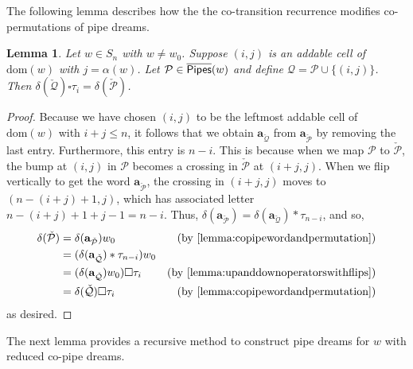 \documentclass[12 pt]{amsart}
\newcommand{\dom}{\mathrm{dom}}
\newcommand{\addable}{\alpha}
\newtheorem{lemma}[Theorem]{Lemma}
\numberwithin{equation}{section}
\theoremstyle{remark}
\newcommand{\kpipes}{\overline{\sf Pipes}}
\newcommand{\demprod}{\delta}
\begin{document}
		The following lemma describes how the the co-transition recurrence modifies co-permutations of pipe dreams.
		
		\begin{lemma}
			\label{lemma:cotransitionflippermutation}
			Let $w \in S_n$ with $w \neq w_0$. 
			Suppose $(i,j)$ is an addable cell of $\dom(w)$ with $j = \addable(w)$. 
			Let $\mathcal{P} \in \kpipes(w)$ and define $\mathcal{Q} = \mathcal{P} \cup \{(i,j)\}$.
			Then $\demprod(\check{\mathcal{Q}})\square \tau_i = \demprod(\check{\mathcal{P}})$.
		\end{lemma}
		
		\begin{proof}
			Because we have chosen $(i,j)$ to be the leftmost addable cell of $\dom(w)$ with $i + j\leq n$, it follows that we obtain ${\mathbf{a}}_{\check{\mathcal{Q}}}$ from ${\mathbf{a}}_{\check{\mathcal{P}}}$ by removing the last entry. 
			Furthermore, this entry is $n - i$. This is because when we map $\mathcal{P}$ to $\check{\mathcal{P}}$, the bump at $(i,j)$ in $\mathcal{P}$ becomes a crossing in $\check{\mathcal{P}}$ at $(i+j,j)$. When we flip vertically to get the word $\mathbf{a}_{\check{\mathcal{P}}}$, the crossing in $(i+j,j)$ moves to $(n-(i+j)+1,j)$, which has associated letter $n-(i+j)+1+j-1=n-i$.
			Thus, $\demprod({\mathbf{a}}_{\check{\mathcal{P}}}) = \demprod({\mathbf{a}}_{\check{\mathcal{Q}}})*\tau_{n-i}$, and so,
			\begin{align*}
				\demprod(\check{\mathcal{P}})
				& = \demprod({\mathbf{a}}_{\check{\mathcal{P}}}) w_0 &\text{(by \cref{lemma:copipewordandpermutation})}\\
				& = (\demprod({\mathbf{a}}_{\check{\mathcal{Q}}})*\tau_{n-i}) w_0 \\
				& = (\demprod({\mathbf{a}}_{\check{\mathcal{Q}}})w_0)\square \tau_{i} & \text{(by \cref{lemma:upanddownoperatorswithflips})}\\
				& = \demprod(\check{\mathcal{Q}})\square \tau_i &\text{(by \cref{lemma:copipewordandpermutation})}
			\end{align*}
			as desired.
		\end{proof}
		
		The next lemma provides a recursive method to construct pipe dreams for $w$ with reduced co-pipe dreams.
		
\end{document}
